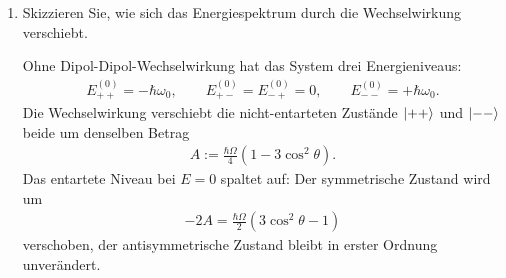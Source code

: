 \documentclass[11pt,a4paper]{scrartcl}
\begin{document}
\begin{enumerate}[label=(\alph*)]
        \item Skizzieren Sie, wie sich das Energiespektrum durch die Wechselwirkung verschiebt.

        \begin{calculationbox}
            \begin{solutionbox}
                Ohne Dipol-Dipol-Wechselwirkung hat das System drei Energieniveaus:
                \begin{align*}
                    E_{++}^{(0)}=-\hbar\omega_0,
                    \qquad
                    E_{+-}^{(0)}=E_{-+}^{(0)}=0,
                    \qquad
                    E_{--}^{(0)}=+\hbar\omega_0.
                \end{align*}
                Die Wechselwirkung verschiebt die nicht-entarteten Zustände $\ket{++}$ und $\ket{--}$ beide um denselben Betrag
                \begin{align*}
                    A
                    :=
                    \frac{\hbar\Omega}{4}(1-3\cos^2\theta).
                \end{align*}
                Das entartete Niveau bei $E=0$ spaltet auf: Der symmetrische Zustand wird um
                \begin{align*}
                    -2A
                    =
                    \frac{\hbar\Omega}{2}(3\cos^2\theta-1)
                \end{align*}
                verschoben, der antisymmetrische Zustand bleibt in erster Ordnung unverändert.
            \end{solutionbox}


\end{calculationbox}
\end{enumerate}
\end{document}
